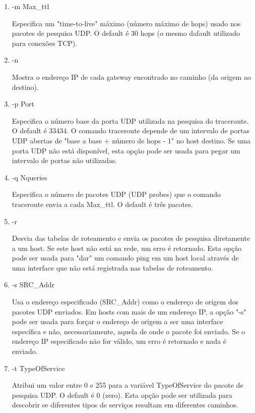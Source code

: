 \documentclass[
	article,			%
	11pt,				%
	oneside,			%
	a4paper,			%
	english,			%
	brazil,				%
	sumario=tradicional
	]{abntex2}
\begin{document}
\begin{enumerate}
	\item -m Max\_ttl
	
	Especifica um "time-to-live" máximo (número máximo de hops) usado nos pacotes de pesquisa UDP. O default é 30 hops (o mesmo dafault utilizado para conexões TCP).
	
	\item -n
	
	Mostra o endereço IP de cada gateway encontrado no caminho (da origem ao destino).
	
		
	\item -p Port   
	
	Especifica o número base da porta UDP utilizada na pesquisa do traceroute. O default é 33434. O comando traceroute depende de um intervalo de portas UDP abertas de "base a base + número de hops - 1" no host destino. Se uma porta UDP não está disponível, esta opção pode ser usada para pegar um intervalo de portas não utilizadas.

	\item -q Nqueries 
	
	Especifica o número de pacotes UDP (UDP probes) que o comando traceroute envia a cada Max\_ttl. O default é três pacotes.

	\vspace{1cm}
	\item -r  	
	
	Desvia das tabelas de roteamento e envia os pacotes de pesquisa diretamente a um host. Se este host não está na rede, um erro é retornado. Esta opção pode ser usada para "dar" um comando ping em um host local através de uma interface que não está registrada nas tabelas de roteamento.
	
	\item -s SRC\_Addr
		
	Usa o endereço especificado (SRC\_Addr) como o endereço de origem dos pacotes UDP enviados. Em hosts com mais de um endereço IP, a opção "-s" pode ser usada para forçar o endereço de origem a ser uma interface específica e não, necessariamente, aquela de onde o pacote foi enviado. Se o endereço IP especificado não for válido, um erro é retornado e nada é enviado.
	

	\item -t TypeOfService
	
	Atribui um valor entre 0 e 255 para a variável TypeOfService do pacote de pesquisa UDP. O default é 0 (zero). Esta opção pode ser utilizada para descobrir se diferentes tipos de serviços resultam em diferentes caminhos.
	

\end{enumerate}
\end{document}
